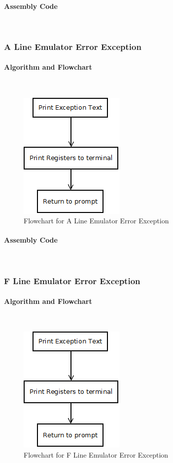 \documentclass[12pt]{article}
\begin{document}
			\paragraph{Assembly Code}~\\	
			
			\subsubsection{A Line Emulator Error Exception}
			\paragraph{Algorithm and Flowchart}~\\
			
			\begin{figure}[H]
				\centering
				\includegraphics[width=0.3\linewidth]{Exception}
				\caption{Flowchart for A Line Emulator Error Exception}
				\label{fig:Aline}
			\end{figure}
			\paragraph{Assembly Code}~\\	
			
			\subsubsection{F Line Emulator Error Exception}
			\paragraph{Algorithm and Flowchart}~\\
			
			\begin{figure}[H]
				\centering
				\includegraphics[width=0.3\linewidth]{Exception}
				\caption{Flowchart for F Line Emulator Error Exception}
				\label{fig:Fline}
			\end{figure}
\end{document}

